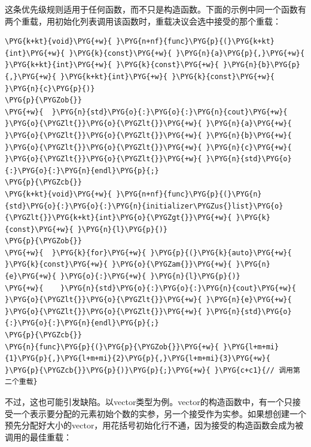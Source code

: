 
这条优先级规则适用于任何函数，而不只是构造函数。下面的示例中同一个函数有两个重载，用初始化列表调用该函数时，重载决议会选中接受的那个重载：



\begin{codeblockbg}
\begin{Verbatim}[commandchars=\\\{\},breaklines=true,breakanywhere=true,fontsize=\codefont,xleftmargin=17bp]
\PYG{k+kt}{void}\PYG{+w}{ }\PYG{n+nf}{func}\PYG{p}{(}\PYG{k+kt}{int}\PYG{+w}{ }\PYG{k}{const}\PYG{+w}{ }\PYG{n}{a}\PYG{p}{,}\PYG{+w}{ }\PYG{k+kt}{int}\PYG{+w}{ }\PYG{k}{const}\PYG{+w}{ }\PYG{n}{b}\PYG{p}{,}\PYG{+w}{ }\PYG{k+kt}{int}\PYG{+w}{ }\PYG{k}{const}\PYG{+w}{ }\PYG{n}{c}\PYG{p}{)}
\PYG{p}{\PYGZob{}}
\PYG{+w}{  }\PYG{n}{std}\PYG{o}{:}\PYG{o}{:}\PYG{n}{cout}\PYG{+w}{ }\PYG{o}{\PYGZlt{}}\PYG{o}{\PYGZlt{}}\PYG{+w}{ }\PYG{n}{a}\PYG{+w}{ }\PYG{o}{\PYGZlt{}}\PYG{o}{\PYGZlt{}}\PYG{+w}{ }\PYG{n}{b}\PYG{+w}{ }\PYG{o}{\PYGZlt{}}\PYG{o}{\PYGZlt{}}\PYG{+w}{ }\PYG{n}{c}\PYG{+w}{ }\PYG{o}{\PYGZlt{}}\PYG{o}{\PYGZlt{}}\PYG{+w}{ }\PYG{n}{std}\PYG{o}{:}\PYG{o}{:}\PYG{n}{endl}\PYG{p}{;}
\PYG{p}{\PYGZcb{}}
\PYG{k+kt}{void}\PYG{+w}{ }\PYG{n+nf}{func}\PYG{p}{(}\PYG{n}{std}\PYG{o}{:}\PYG{o}{:}\PYG{n}{initializer\PYGZus{}list}\PYG{o}{\PYGZlt{}}\PYG{k+kt}{int}\PYG{o}{\PYGZgt{}}\PYG{+w}{ }\PYG{k}{const}\PYG{+w}{ }\PYG{n}{l}\PYG{p}{)}
\PYG{p}{\PYGZob{}}
\PYG{+w}{  }\PYG{k}{for}\PYG{+w}{ }\PYG{p}{(}\PYG{k}{auto}\PYG{+w}{ }\PYG{k}{const}\PYG{+w}{ }\PYG{o}{\PYGZam{}}\PYG{+w}{ }\PYG{n}{e}\PYG{+w}{ }\PYG{o}{:}\PYG{+w}{ }\PYG{n}{l}\PYG{p}{)}
\PYG{+w}{    }\PYG{n}{std}\PYG{o}{:}\PYG{o}{:}\PYG{n}{cout}\PYG{+w}{ }\PYG{o}{\PYGZlt{}}\PYG{o}{\PYGZlt{}}\PYG{+w}{ }\PYG{n}{e}\PYG{+w}{ }\PYG{o}{\PYGZlt{}}\PYG{o}{\PYGZlt{}}\PYG{+w}{ }\PYG{n}{std}\PYG{o}{:}\PYG{o}{:}\PYG{n}{endl}\PYG{p}{;}
\PYG{p}{\PYGZcb{}}
\PYG{n}{func}\PYG{p}{(}\PYG{p}{\PYGZob{}}\PYG{+w}{ }\PYG{l+m+mi}{1}\PYG{p}{,}\PYG{l+m+mi}{2}\PYG{p}{,}\PYG{l+m+mi}{3}\PYG{+w}{ }\PYG{p}{\PYGZcb{}}\PYG{p}{)}\PYG{p}{;}\PYG{+w}{ }\PYG{c+c1}{// 调用第二个重载}
\end{Verbatim}
\end{codeblockbg}



不过，这也可能引发缺陷。以vector类型为例。vector的构造函数中，有一个只接受一个表示要分配的元素初始个数的实参，另一个接受作为实参。如果想创建一个预先分配好大小的vector，用花括号初始化行不通，因为接受的构造函数会成为被调用的最佳重载：



